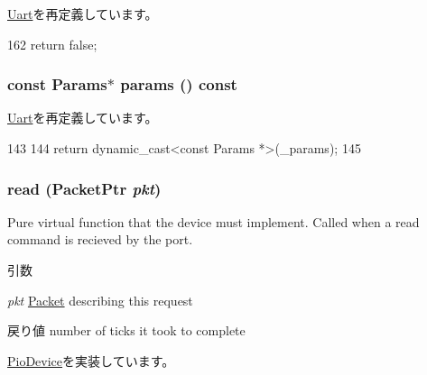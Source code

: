 \hyperlink{classUart_a73c7d9c634e4c31cda71a6dd2fa67381}{Uart}を再定義しています。


\begin{DoxyCode}
162 { return false; }
\end{DoxyCode}
\hypertarget{classPl011_acd3c3feb78ae7a8f88fe0f110a718dff}{
\subsubsection[{params}]{\setlength{\rightskip}{0pt plus 5cm}const {\bf Params}$\ast$ params () const}}
\label{classPl011_acd3c3feb78ae7a8f88fe0f110a718dff}


\hyperlink{classUart_acd3c3feb78ae7a8f88fe0f110a718dff}{Uart}を再定義しています。


\begin{DoxyCode}
143     {
144         return dynamic_cast<const Params *>(_params);
145     }
\end{DoxyCode}
\hypertarget{classPl011_a613ec7d5e1ec64f8d21fec78ae8e568e}{
\subsubsection[{read}]{ read ({\bf PacketPtr} {\em pkt})}}
\label{classPl011_a613ec7d5e1ec64f8d21fec78ae8e568e}
Pure virtual function that the device must implement. Called when a read command is recieved by the port. 
\begin{DoxyParams}{引数}
\item[{\em pkt}]\hyperlink{classPacket}{Packet} describing this request \end{DoxyParams}
\begin{DoxyReturn}{戻り値}
number of ticks it took to complete 
\end{DoxyReturn}


\hyperlink{classPioDevice_a842312590432036092c422c87a442358}{PioDevice}を実装しています。


